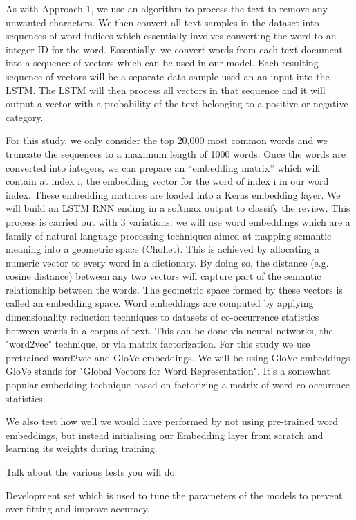\documentclass[conference]{IEEEtran}
\begin{document}
As with Approach 1, we use an algorithm to process the text to remove any unwanted characters. We then convert all text samples in the dataset into sequences of word indices which essentially involves converting the word to an integer ID for the word. Essentially, we convert words from each text document into a sequence of vectors which can be used in our model. Each resulting sequence of vectors will be a separate data sample used an an input into the LSTM. The LSTM will then process all vectors in that sequence and it will output a vector with a probability of the text belonging to a positive or negative category. 

For this study, we only consider the top 20,000 most common words and we truncate the sequences to a maximum length of 1000 words. Once the words are converted into integers, we can prepare an “embedding matrix” which will contain at index i, the embedding vector for the word of index i in our word index. These embedding matrices are loaded into a Keras embedding layer. We will build an LSTM RNN ending in a softmax output to classify the review. This process is carried out with 3 variations: we will use word embeddings which are a family of natural language processing techniques aimed at mapping semantic meaning into a geometric space (Chollet). This is achieved by allocating a numeric vector to every word in a dictionary. By doing so, the distance (e.g. cosine distance) between any two vectors will capture part of the semantic relationship between the words. The geometric space formed by these vectors is called an embedding space. Word embeddings are computed by applying dimensionality reduction techniques to datasets of co-occurrence statistics between words in a corpus of text. This can be done via neural networks, the "word2vec" technique, or via matrix factorization. For this study we use pretrained word2vec and GloVe embeddings.  We will be using GloVe embeddings GloVe stands for "Global Vectors for Word Representation". It's a somewhat popular embedding technique based on factorizing a matrix of word co-occurence statistics.

We  also test how well we would have performed by not using pre-trained word embeddings, but instead initialising our Embedding layer from scratch and learning its weights during training.

Talk about the various tests you will do: 

Development set which is used to tune the parameters of the models to prevent over-fitting and improve accuracy. 
\end{document}
